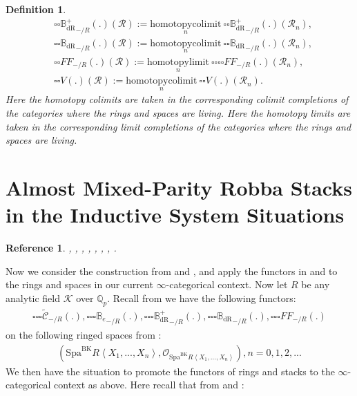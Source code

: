 \documentclass[12pt]{book}
\newtheorem{definition}{Definition}
\newtheorem{reference}{Reference}
\begin{document}
\begin{definition}
\begin{align}
&{\square\square}{\mathbb{B}_\mathrm{dR}^+}_{-/R}(.)(\mathcal{R}):=\underset{n}{\mathrm{homotopycolimit}}~{\square\square}{\mathbb{B}_\mathrm{dR}^+}_{-/R}(.)(\mathcal{R}_n),\\
&{\square\square}{\mathbb{B}_\mathrm{dR}}_{-/R}(.)(\mathcal{R}):=\underset{n}{\mathrm{homotopycolimit}}~{\square\square}{\mathbb{B}_\mathrm{dR}}_{-/R}(.)(\mathcal{R}_n),\\
&{\square\square}{{FF}}_{-/R}(.)(\mathcal{R}):=\underset{n}{\mathrm{homotopylimit}}~{\square\square}{\square\square}{{FF}}_{-/R}(.)(\mathcal{R}_n),\\	
&{\square\square}V(.)(\mathcal{R}):=\underset{n}{\mathrm{homotopycolimit}}~{\square\square}V(.)(\mathcal{R}_n).
\end{align}
Here the homotopy colimits are taken in the corresponding colimit completions of the categories where the rings and spaces are living. Here the homotopy limits are taken in the corresponding limit completions of the categories where the rings and spaces are living.
\end{definition}










\newpage
\section{Almost Mixed-Parity Robba Stacks in the Inductive System Situations}


\begin{reference}
\cite{KL1}, \cite{KL2}, \cite{Sch1}, \cite{Sch}, \cite{Fon}, \cite{FF}, \cite{F1}, \cite{Ta}.
\end{reference}


Now we consider the construction from \cite[Definition 9.3.3, Definition 9.3.5, Definition 9.3.11, Definition 9.3.9]{KL1} and \cite{KL2}, and apply the functors in \cite[Definition 9.3.3, Definition 9.3.5, Definition 9.3.11, Definition 9.3.9]{KL1} and \cite{KL2} to the rings and spaces in our current $\infty$-categorical context. Now let $R$ be any analytic field $\mathcal{K}$ over $\mathbb{Q}_p$. Recall from \cite[Definition 9.3.3, Definition 9.3.5, Definition 9.3.11, Definition 9.3.9]{KL1} we have the following functors:
\begin{align}
{\square\square\square}\widetilde{\mathcal{C}}_{-/R}(.),{\square\square\square}{\mathbb{B}_e}_{-/R}(.),{\square\square\square}{\mathbb{B}_\mathrm{dR}^+}_{-/R}(.),{\square\square\square}{\mathbb{B}_\mathrm{dR}}_{-/R}(.),{\square\square\square}{FF}_{-/R}(.)	
\end{align}
on the following ringed spaces from \cite{BK}:
\begin{align}
(\mathrm{Spa}^\mathrm{BK}R\left<X_1,...,X_n\right>,\mathcal{O}_{\mathrm{Spa}^\mathrm{BK}R\left<X_1,...,X_n\right>}),n=0,1,2,...	
\end{align}
We then have the situation to promote the functors of rings and stacks to the $\infty$-categorical context as above. Here recall that from \cite[Definition 9.3.3, Definition 9.3.5, Definition 9.3.11, Definition 9.3.9]{KL1} and \cite{KL2}:
\end{document}
